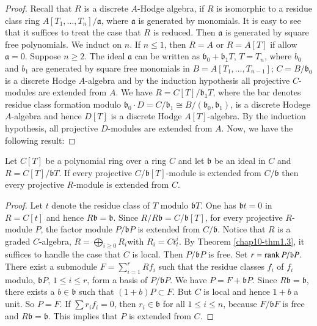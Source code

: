 \begin{proof}
Recall that $R$ is a discrete $A$-Hodge algebra, if $R$ is isomorphic
to a residue class ring $A[T_{1},\ldots,T_{n}]/\mathfrak{a}$, where
$\mathfrak{a}$ is generated by monomials. It is easy to see that it
suffices to treat the case that $R$ is reduced. Then $\mathfrak{a}$ is
generated by square free polynomials. We induct on $n$. If $n\leq 1$,
then $R=A$ or $R=A[T]$ if allow $\mathfrak{a}=0$. Suppose $n\geq
2$. The ideal $\mathfrak{a}$ can be written as
$\mathfrak{b}_{0}+\mathfrak{b}_{1}T$, $T=T_{n}$, where $b_{0}$ and
$b_{1}$ are generated by square free monomials in
$B=A[T_{1},\ldots,T_{n-1}]$; $C=B/\mathfrak{b}_{0}$ is a discrete
Hodge $A$-algebra and by the induction hypothesis all projective
$C$-modules are extended from $A$. We have $R=C[T]/\mathfrak{b}_{1}T$,
where the bar denotes residue class formation modulo
$\mathfrak{b}_{0}\cdot D=C/\mathfrak{b}_{1}\cong
B/(\mathfrak{b}_{0},\mathfrak{b}_{1})$, is a discrete Hodege
$A$-algebra and hence $D[T]$ is a discrete Hodge $A[T]$-algebra. By
the induction hypothesis, all projective $D$-modules are extended from
$A$. Now, we have the following result:
\end{proof}

\begin{sublem}\label{chap10-lem1.6}
Let $C[T]$ be a polynomial ring over a ring $C$ and let $\mathfrak{b}$
be an ideal in $C$ and $R=C[T]/\mathfrak{b}T$. If every projective
$C/\mathfrak{b}[T]$-module is extended from $C/\mathfrak{b}$ then
every projective $R$-module is extended from $C$.
\end{sublem}

\begin{proof}
Let $t$ denote the residue class of $T$ modulo $\mathfrak{b}T$. One
has $\mathfrak{b}t=0$ in $R=C[t]$ and hence
$R\mathfrak{b}=\mathfrak{b}$. Since
$R/R\mathfrak{b}=C/\mathfrak{b}[T]$, for every projective $R$-module
$P$, the factor module $P/\mathfrak{b}P$ is extended from
$C/\mathfrak{b}$. Notice that $R$ is a graded $C$-algebra,
$R=\bigoplus\limits_{i\geq 0}R_{i}$\pageoriginale with
$R_{i}=Ct^{i}_{t}$. By Theorem \ref{chap10-thm1.3}, it suffices to
handle the case that $C$ is local. Then $P/\mathfrak{b}P$ is free. Set
$r=\operatorname{rank} P/\mathfrak{b}P$. There exist a submodule
$F=\sum\limits^{r}_{i=1}Rf_{i}$ such that the residue classes $f_{i}$
of $f_{i}$ modulo, $\mathfrak{b}P$, $1\leq i\leq r$, form a basis of
$P/\mathfrak{b}P$. We have $P=F+\mathfrak{b}P$. Since
$R\mathfrak{b}=\mathfrak{b}$, there exists a $b\in \mathfrak{b}$ such
that $(1+b)P\subset F$. But $C$ is local and hence $1+b$ a unit. So
$P=F$. If $\sum r_{i}f_{i}=0$, then $r_{i}\in \mathfrak{b}$ for all
$1\leq i\leq n$, because $F/\mathfrak{b}F$ is free and
$R\mathfrak{b}=\mathfrak{b}$. This implies that $P$ is extended from
$C$.
\end{proof}

